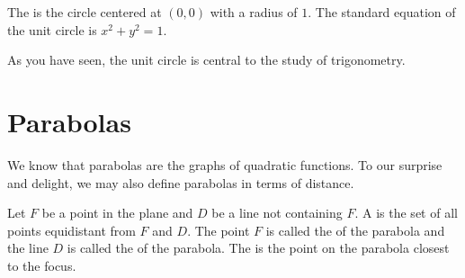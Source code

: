 \documentclass[nooutcomes]{ximera}
\begin{document}
\begin{definition}
\label{UnitCircle}
The   is the circle centered at $(0,0)$ with a radius of $1$.  The standard equation of the unit circle is $x^2 + y^2 = 1.$

\end{definition}

As you have seen, the unit circle is central to the study of trigonometry.

\section{Parabolas}
We know that parabolas are the graphs of quadratic functions. To our surprise and delight, we may also define parabolas in terms of distance.

\begin{definition}
Let $F$ be a point in the plane and $D$ be a line not containing $F$.   A    is the set of all points equidistant from $F$ and $D$.  The point $F$ is called the    of the parabola and the line $D$ is called the    of the parabola. The    is the point on the parabola closest to the focus.  
\end{definition}
\end{document}
